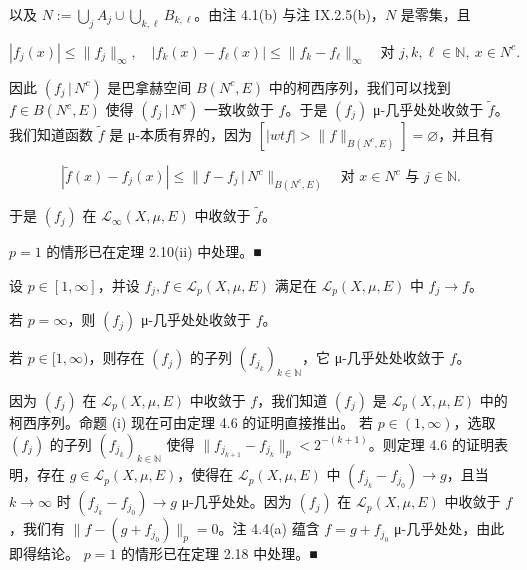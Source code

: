 \begin{theorem}
\begin{subitems}
以及 $ N := \bigcup_j A_j \cup \bigcup_{k,\ell} B_{k,\ell} $。由注 4.1(b) 与注 IX.2.5(b)，$ N $ 是零集，且

\[
|f_j(x)| \le \|f_j\|_\infty , \quad |f_k(x) - f_\ell(x)| \le \|f_k - f_\ell\|_\infty \quad \text{对 } j, k, \ell \in \mathbb{N},\ x \in N^c .
\]

因此 $ (f_j\,|\,N^c) $ 是巴拿赫空间 $ B(N^c,E) $ 中的柯西序列，我们可以找到 $ f \in B(N^c,E) $ 使得 $ (f_j\,|\,N^c) $ 一致收敛于 $ f $。于是 $ (f_j) $ μ-几乎处处收敛于 $ \tilde{f} $。我们知道函数 $ \tilde{f} $ 是 μ-本质有界的，因为 $ [|wtf| > \|f\|_{B(N^c,E)}] = \varnothing $，并且有

\[
|\tilde{f}(x) - f_j(x)| \le \|f - f_j\,|\,N^c\|_{B(N^c,E)} \quad \text{对 } x \in N^c \text{ 与 } j \in \mathbb{N} .
\]

于是 $ (f_j) $ 在 $ \mathcal{L}_\infty(X,\mu,E) $ 中收敛于 $ \tilde{f} $。

\item

$ p = 1 $ 的情形已在定理 2.10(ii) 中处理。\nobreak\hspace{0.35em}■

\end{subitems}

\end{theorem}

\begin{corollary}

设 $ p \in [1,\infty] $，并设 $ f_j, f \in \mathcal{L}_p(X,\mu,E) $ 满足在 $ \mathcal{L}_p(X,\mu,E) $ 中 $ f_j \to f $。

\begin{subitems}
\item

若 $ p = \infty $，则 $ (f_j) $ μ-几乎处处收敛于 $ f $。

\item

若 $ p \in [1,\infty) $，则存在 $ (f_j) $ 的子列 $ (f_{j_k})_{k \in \mathbb{N}} $，它 μ-几乎处处收敛于 $ f $。

\proofhead
因为 $ (f_j) $ 在 $ \mathcal{L}_p(X,\mu,E) $ 中收敛于 $ f $，我们知道 $ (f_j) $ 是 $ \mathcal{L}_p(X,\mu,E) $ 中的柯西序列。命题 (i) 现在可由定理 4.6 的证明直接推出。
若 $ p \in (1,\infty) $，选取 $ (f_j) $ 的子列 $ (f_{j_k})_{k \in \mathbb{N}} $ 使得 $ \|f_{j_{k+1}} - f_{j_k}\|_p < 2^{-(k+1)} $。则定理 4.6 的证明表明，存在 $ g \in \mathcal{L}_p(X,\mu,E) $，使得在 $ \mathcal{L}_p(X,\mu,E) $ 中 $ (f_{j_k} - f_{j_0}) \to g $，且当 $ k \to \infty $ 时 $ (f_{j_k} - f_{j_0}) \to g $ μ-几乎处处。因为 $ (f_j) $ 在 $ \mathcal{L}_p(X,\mu,E) $ 中收敛于 $ f $，我们有 $ \|f - (g + f_{j_0})\|_p = 0 $。注 4.4(a) 蕴含 $ f = g + f_{j_0} $ μ-几乎处处，由此即得结论。
$ p = 1 $ 的情形已在定理 2.18 中处理。\nobreak\hspace{0.35em}■
\end{subitems}

\end{corollary}

